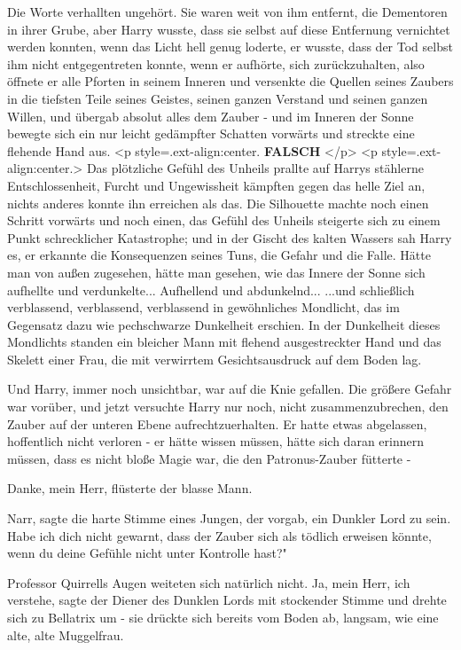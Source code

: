 Die Worte verhallten ungehört. Sie waren weit von ihm entfernt, die Dementoren
in ihrer Grube, aber Harry wusste, dass sie selbst auf diese Entfernung
vernichtet werden konnten, wenn das Licht hell genug loderte, er wusste, dass
der Tod selbst ihm nicht entgegentreten konnte, wenn er aufhörte, sich
zurückzuhalten, also öffnete er alle Pforten in seinem Inneren und versenkte die
Quellen seines Zaubers in die tiefsten Teile seines Geistes, seinen ganzen
Verstand und seinen ganzen Willen, und übergab absolut alles dem Zauber - und im
Inneren der Sonne bewegte sich ein nur leicht gedämpfter Schatten vorwärts und
streckte eine flehende Hand aus. <p style=\grqq{}.ext-align:center\grqq{}.
\textbf{FALSCH} </p> <p style=\grqq{}.ext-align:center\grqq{}.> Das plötzliche
Gefühl des Unheils prallte auf Harrys stählerne Entschlossenheit, Furcht und
Ungewissheit kämpften gegen das helle Ziel an, nichts anderes konnte ihn
erreichen als das. Die Silhouette machte noch einen Schritt vorwärts und noch
einen, das Gefühl des Unheils steigerte sich zu einem Punkt schrecklicher
Katastrophe; und in der Gischt des kalten Wassers sah Harry es, er erkannte die
Konsequenzen seines Tuns, die Gefahr und die Falle. Hätte man von außen
zugesehen, hätte man gesehen, wie das Innere der Sonne sich aufhellte und
verdunkelte... Aufhellend und abdunkelnd... ...und schließlich verblassend,
verblassend, verblassend in gewöhnliches Mondlicht, das im Gegensatz dazu wie
pechschwarze Dunkelheit erschien. In der Dunkelheit dieses Mondlichts standen
ein bleicher Mann mit flehend ausgestreckter Hand und das Skelett einer Frau,
die mit verwirrtem Gesichtsausdruck auf dem Boden lag.

Und Harry, immer noch unsichtbar, war auf die Knie gefallen. Die größere Gefahr
war vorüber, und jetzt versuchte Harry nur noch, nicht zusammenzubrechen, den
Zauber auf der unteren Ebene aufrechtzuerhalten. Er hatte etwas abgelassen,
hoffentlich nicht verloren - er hätte wissen müssen, hätte sich daran erinnern
müssen, dass es nicht bloße Magie war, die den Patronus-Zauber fütterte -

\glqq Danke, mein Herr\grqq{}, flüsterte der blasse Mann.

\glqq Narr\grqq{}, sagte die harte Stimme eines Jungen, der vorgab, ein Dunkler
Lord zu sein. \glqq Habe ich dich nicht gewarnt, dass der Zauber sich als
tödlich erweisen könnte, wenn du deine Gefühle nicht unter Kontrolle hast?"

Professor Quirrells Augen weiteten sich natürlich nicht. \glqq Ja, mein Herr,
ich verstehe\grqq{}, sagte der Diener des Dunklen Lords mit stockender Stimme
und drehte sich zu Bellatrix um - sie drückte sich bereits vom Boden ab,
langsam, wie eine alte, alte Muggelfrau.

